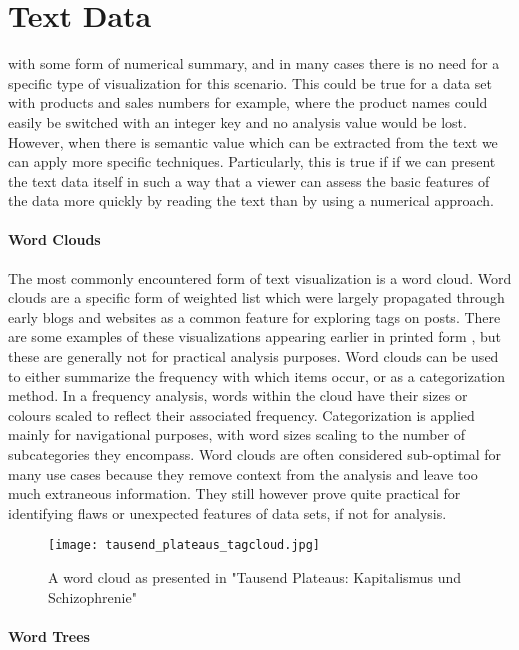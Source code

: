 \section{Text Data}
\label{sec:text_data}
 with some form of numerical summary, and in many cases there is no need for a specific type of visualization for this scenario. This could be true for a data set with products and sales numbers for example, where the product names could easily be switched with an integer key and no analysis value would be lost. However, when there is semantic value which can be extracted from the text we can apply more specific techniques. Particularly, this is true if if we can present the text data itself in such a way that a viewer can assess the basic features of the data more quickly by reading the text than by using a numerical approach.

\paragraph{Word Clouds}
The most commonly encountered form of text visualization is a word cloud. Word clouds are a specific form of weighted list which were largely propagated through early blogs and websites as a common feature for exploring tags on posts. There are some examples of these visualizations appearing earlier in printed form \cite{Deleuze1987}, but these are generally not for practical analysis purposes. Word clouds can be used to either summarize the frequency with which items occur, or as a categorization method. In a frequency analysis, words within the cloud have their sizes or colours scaled to reflect their associated frequency. Categorization is applied mainly for navigational purposes, with word sizes scaling to the number of subcategories they encompass. Word clouds are often considered sub-optimal for many use cases because they remove context from the analysis and leave too much extraneous information. They still however prove quite practical for identifying flaws or unexpected features of data sets, if not for analysis. 

\begin{figure}
	\centering
	\label{fig:wordcloud}
	\texttt{[image: tausend\_plateaus\_tagcloud.jpg]}
	\caption{A word cloud as presented in "Tausend Plateaus: Kapitalismus und Schizophrenie" \cite{Deleuze1987}}
\end{figure}

\paragraph{Word Trees}
\cite{Wattenburg2008}

